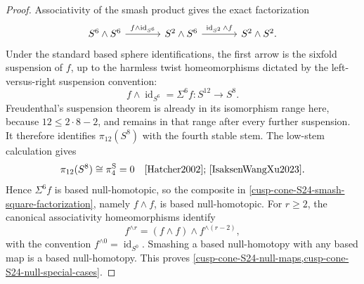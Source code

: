 \begin{proof}
Associativity of the smash product gives the
exact factorization
\begin{equation}
 \begin{tikzcd}[column sep=large]
 S^6\wedge S^6
 \arrow[r,"f\wedge\operatorname{id}_{S^6}"]&
 S^2\wedge S^6
 \arrow[r,"\operatorname{id}_{S^2}\wedge f"]&
 S^2\wedge S^2 .
 \end{tikzcd}
 \label{cusp-cone-S24-smash-square-factorization}
\end{equation}
Under the standard based sphere identifications, the first arrow is the
sixfold suspension of \(f\), up to the harmless twist homeomorphisms dictated
by the left-versus-right suspension convention:
\begin{equation}
 f\wedge\operatorname{id}_{S^6}
 =\Sigma^6f:S^{12}\longrightarrow S^8.
 \label{cusp-cone-S24-sixfold-suspension}
\end{equation}
Freudenthal's suspension theorem is already in its isomorphism range here,
because \(12\leq 2\cdot8-2\), and remains in that range after every further
suspension.  It therefore identifies \(\pi_{12}(S^8)\) with the fourth
stable stem.  The low-stem calculation gives
\begin{equation}
 \pi_{12}(S^8)\cong\pi_4^{\mathrm S}=0
 \quad
 \text{\cite[Corollary~4.24, p.~360]{Hatcher2002};
 \cite[Table~1, p.~113]{IsaksenWangXu2023}}.
 \label{cusp-cone-fourth-stable-stem}
\end{equation}
Hence \(\Sigma^6f\) is based null-homotopic, so the composite in
\cref{cusp-cone-S24-smash-square-factorization}, namely
\(f\wedge f\), is based null-homotopic.  For \(r\geq2\), the canonical
associativity homeomorphisms identify
\begin{equation}
 f^{\wedge r}=(f\wedge f)\wedge f^{\wedge(r-2)},
\end{equation}
with the convention \(f^{\wedge0}=\operatorname{id}_{S^0}\).  Smashing a
based null-homotopy with any based map is a based null-homotopy.  This proves
\cref{cusp-cone-S24-null-maps,cusp-cone-S24-null-special-cases}.
\end{proof}

